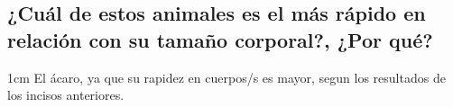 {\begin{parts}
               \part{¿Cuál de estos animales es el más rápido en relación con su tamaño corporal?, ¿Por qué?}
     
                    \begin{solutionbox}{1cm}\footnotesize%
                         El \'acaro, ya que su rapidez en cuerpos/s es mayor, segun los resultados de los incisos anteriores.
                    \end{solutionbox}
          \end{parts}
     }

     \newpage


